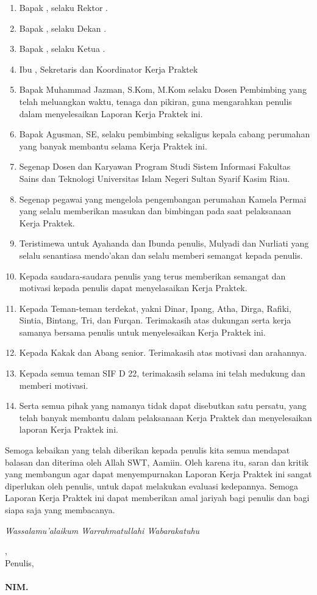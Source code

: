 \begin{enumerate}
	\item Bapak \rektor, selaku Rektor \universitas.
	\item Bapak \dekan, selaku Dekan \fakultas.
	\item Bapak \kaprodi, selaku Ketua \programStudi \space
	      \fakultas \space \universitas.
	\item Ibu \sekretarisprodi, Sekretaris dan Koordinator Kerja Praktek \programStudi \space
	      \fakultas \space \universitas
       \item Bapak Muhammad Jazman, S.Kom, M.Kom selaku  Dosen Pembimbing yang telah meluangkan waktu, tenaga dan pikiran, guna mengarahkan penulis dalam menyelesaikan Laporan Kerja Praktek ini.
	\item Bapak Agusman, SE, selaku pembimbing sekaligus kepala cabang perumahan yang banyak membantu selama Kerja Praktek ini.
 \item Segenap Dosen dan Karyawan Program Studi Sistem Informasi Fakultas Sains dan Teknologi Universitas Islam Negeri Sultan Syarif Kasim Riau.
 \item Segenap pegawai yang mengelola pengembangan perumahan Kamela Permai yang selalu memberikan masukan dan bimbingan pada saat pelaksanaan Kerja Praktek.
 \item Teristimewa untuk Ayahanda dan Ibunda penulis, Mulyadi dan Nurliati yang selalu senantiasa mendo’akan dan selalu memberi semangat kepada penulis.
 \item Kepada saudara-saudara penulis yang terus memberikan semangat dan motivasi kepada penulis dapat menyelasaikan Kerja Praktek.
 \item Kepada Teman-teman terdekat, yakni Dinar, Ipang, Atha, Dirga, Rafiki, Sintia, Bintang, Tri, dan Furqan. Terimakasih atas dukungan serta kerja samanya bersama penulis untuk menyelesaikan Kerja Praktek ini.
 \item  Kepada Kakak dan Abang senior. Terimakasih atas motivasi dan arahannya.
 \item Kepada semua teman SIF D 22, terimakasih selama ini telah medukung dan memberi motivasi.
 \item Serta semua pihak yang namanya tidak dapat disebutkan satu persatu, yang telah banyak membantu dalam pelaksanaan Kerja Praktek dan menyelesaikan laporan Kerja Praktek ini.

\end{enumerate}

Semoga kebaikan yang telah diberikan kepada penulis kita semua mendapat balasan dan diterima oleh Allah SWT, Aamiin. Oleh karena itu, saran dan kritik yang membangun agar dapat menyempurnakan Laporan Kerja Praktek ini sangat diperlukan oleh penulis, untuk dapat melakukan evaluasi kedepannya. Semoga Laporan Kerja Praktek ini dapat memberikan amal jariyah bagi penulis dan bagi siapa saja yang membacanya.

\par \textit{Wassalamu'alaikum Warrahmatullahi Wabarakatuhu}

\vspace*{0.1cm}

\begin{flushright}
	\kota, \tanggalPersetujuan\\
	Penulis,\\
	\vspace{2cm}
	\textbf{\underline{\penulis}\\
		NIM. \nim}

\end{flushright}


